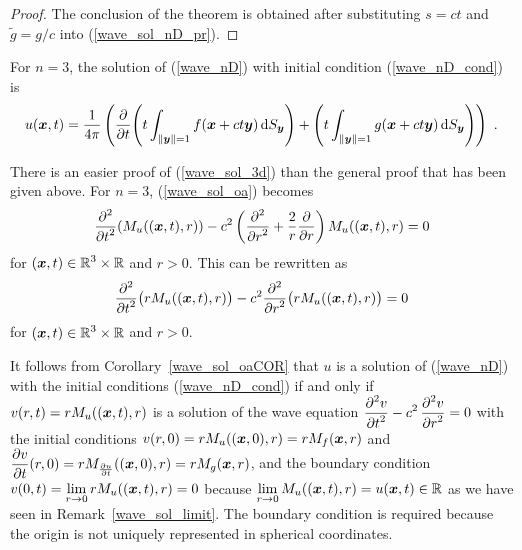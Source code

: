 \begin{proof}
The conclusion of the theorem is obtained after substituting $s=ct$
and $\tilde{g} = g/c$ into (\ref{wave_sol_nD_pr}).
\end{proof}

For $n=3$, the solution of (\ref{wave_nD}) with initial condition
(\ref{wave_nD_cond}) is
\begin{equation} \label{wave_sol_3d}
u(\VEC{x},t) = \frac{1}{4\pi}
\left( \pdfdx{
\left( t \int_{\|\VEC{y}\|=1} f(\VEC{x} + ct \VEC{y})
\dss{S}{y} \right)}{t} +
\left( t \int_{\|\VEC{y}\|=1} g(\VEC{x}+ ct \VEC{y})
\dss{S}{y} \right) \right) \ .
\end{equation}

\begin{rmk}
There is an easier proof of (\ref{wave_sol_3d}) than the general proof
that has been given above.  For $n=3$, (\ref{wave_sol_oa}) becomes
\[
\pdfdxn{ \left(M_u((\VEC{x},t),r)\right) }{t}{2}
- c^2 \left( \pdydxn{}{r}{2} + \frac{2}{r} \pdydx{}{r} \right)
M_u((\VEC{x},t),r) = 0
\]
for $\DS (\VEC{x},t) \in \RR^3 \times \RR$ and $r > 0$.
This can be rewritten as
\[
\pdfdxn{ \big(rM_u((\VEC{x},t),r)\big) }{t}{2} \\
- c^2 \pdfdxn{ \big(rM_u((\VEC{x},t),r)\big)}{r}{2} = 0
\]
for $\DS (\VEC{x},t) \in \RR^3 \times \RR$ and $r > 0$.

It follows from Corollary~\ref{wave_sol_oaCOR} that
$u$ is a solution of (\ref{wave_nD}) with the
initial conditions (\ref{wave_nD_cond}) if and only if
$v(r,t) = rM_u((\VEC{x},t),r)$ is a solution of the wave
equation $\DS \pdydxn{v}{t}{2} - c^2\, \pdydxn{v}{r}{2} = 0$ with
the initial conditions
$\DS v(r,0) = rM_u((\VEC{x},0),r) = rM_f(\VEC{x},r)$
and $\DS
\pdydx{v}{t}(r,0) = rM_{\pdydx{u}{t}}((\VEC{x},0),r) = rM_g(\VEC{x},r)$,
and the boundary condition
$\DS v(0,t) = \lim_{r\rightarrow 0} rM_u((\VEC{x},t),r) = 0$
because $\DS \lim_{r\rightarrow 0} M_u((\VEC{x},t),r) =
u(\VEC{x},t) \in \RR$ as we have seen in Remark~\ref{wave_sol_limit}.
The boundary condition is required because the origin is not uniquely
represented in spherical coordinates.


\end{rmk}
